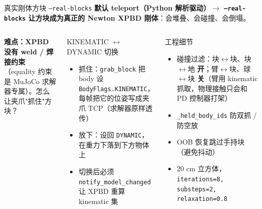 \documentclass[aspectratio=169, 11pt]{beamer}
\begin{document}
\begin{frame}[fragile]{真实刚体方块 \texttt{--real-blocks}}
\textbf{默认 teleport（Python 解析驱动）$\to$ \texttt{--real-blocks} 让方块成为真正的
Newton XPBD 刚体}：会堆叠、会碰撞、会倒塌。
\vspace{4pt}
\begin{columns}[T]
\textbf{难点：XPBD 没有 weld / 焊接约束}\\
\footnotesize（equality 约束是 MuJoCo 求解器专属）。怎么让夹爪"抓住"方块？
\vspace{4pt}
\begin{block}{KINEMATIC $\leftrightarrow$ DYNAMIC 切换}
\footnotesize
\begin{itemize}
\item 抓住：\texttt{grab\_block} 把 body 设 \texttt{BodyFlags.KINEMATIC}，每帧把它的位姿写成夹爪 TCP（求解器原样透传）
\item 放下：设回 \texttt{DYNAMIC}，在重力下落到下方物体上
\item 切换后必须 \texttt{notify\_model\_changed} 让 XPBD 重算 kinematic 集
\end{itemize}
\end{block}

\begin{block}{工程细节}
\footnotesize
\begin{itemize}
\item 碰撞过滤：块$\leftrightarrow$块、块$\leftrightarrow$地 \textbf{开}；臂$\leftrightarrow$块、球$\leftrightarrow$块 \textbf{关}（臂用 kinematic 抓取，物理接触只会和 PD 控制器打架）
\item \texttt{\_held\_body\_ids} 防双抓 / 防空放
\item OOB 恢复跳过手持块（避免抖动）
\item 20 cm 立方体，\texttt{iterations=8, substeps=2, relaxation=0.8}
\end{itemize}
\end{block}
\end{columns}
\end{frame}
\end{document}
